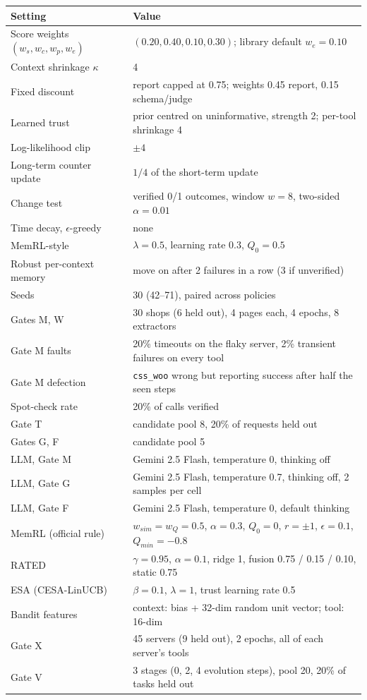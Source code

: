 \documentclass[11pt]{article}
\begin{document}
\begin{table}[H]
\centering
\small
\begin{tabular}{ll}
\toprule
Setting & Value \\
\midrule
Score weights $(w_s,w_c,w_p,w_e)$ & $(0.20,0.40,0.10,0.30)$; library default $w_e=0.10$ \\
Context shrinkage $\kappa$ & 4 \\
Fixed discount & report capped at 0.75; weights 0.45 report, 0.15 schema/judge \\
Learned trust & prior centred on uninformative, strength 2; per-tool shrinkage 4 \\
Log-likelihood clip & $\pm 4$ \\
Long-term counter update & $1/4$ of the short-term update \\
Change test & verified 0/1 outcomes, window $w=8$, two-sided $\alpha=0.01$ \\
Time decay, $\epsilon$-greedy & none \\
MemRL-style & $\lambda=0.5$, learning rate 0.3, $Q_0=0.5$ \\
Robust per-context memory & move on after 2 failures in a row (3 if unverified) \\
Seeds & 30 (42--71), paired across policies \\
Gates M, W & 30 shops (6 held out), 4 pages each, 4 epochs, 8 extractors \\
Gate M faults & 20\% timeouts on the flaky server, 2\% transient failures on every tool \\
Gate M defection & \texttt{css\_woo} wrong but reporting success after half the seen steps \\
Spot-check rate & 20\% of calls verified \\
Gate T & candidate pool 8, 20\% of requests held out \\
Gates G, F & candidate pool 5 \\
LLM, Gate M & Gemini 2.5 Flash, temperature 0, thinking off \\
LLM, Gate G & Gemini 2.5 Flash, temperature 0.7, thinking off, 2 samples per cell \\
LLM, Gate F & Gemini 2.5 Flash, temperature 0, default thinking \\
MemRL (official rule) & $w_{sim}=w_Q=0.5$, $\alpha=0.3$, $Q_0=0$, $r=\pm1$, $\epsilon=0.1$, $Q_{min}=-0.8$ \\
RATED & $\gamma=0.95$, $\alpha=0.1$, ridge 1, fusion 0.75 / 0.15 / 0.10, static 0.75 \\
ESA (CESA-LinUCB) & $\beta=0.1$, $\lambda=1$, trust learning rate 0.5 \\
Bandit features & context: bias + 32-dim random unit vector; tool: 16-dim \\
Gate X & 45 servers (9 held out), 2 epochs, all of each server's tools \\
Gate V & 3 stages (0, 2, 4 evolution steps), pool 20, 20\% of tasks held out \\
\bottomrule
\end{tabular}
\end{table}
\end{document}

